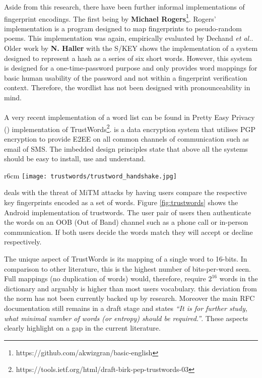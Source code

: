 Aside from this research, there have been further informal implementations of fingerprint encodings. The first being by \textbf{Michael Rogers}\footnote{https://github.com/akwizgran/basic-english}. Rogers' implementation is a program designed to map fingerprints to pseudo-random poems. This implementation was again, empirically evaluated by Dechand \textit{et al.}\cite{dechand2016empirical}. Older work by \textbf{N. Haller} with the S/KEY\cite{haller1995s} shows the implementation of a system designed to represent a hash as a series of six short words. However, this system is designed for a one-time-password purpose and only provides word mappings for basic human usability of the password and not within a fingerprint verification context. Therefore, the wordlist has not been designed with pronounceability in mind.
\\\\
A very recent implementation of a word list can be found in Pretty Easy Privacy (\pep) implementation of TrustWords\footnote{https://tools.ietf.org/html/draft-birk-pep-trustwords-03}. \pep is a data encryption system that utilises PGP encryption to provide E2EE on all common channels of communication such as email of SMS. The imbedded design principles state that above all the systems should be easy to install, use and understand.

\begin{wrapfigure}{r}{6cm}
    \centering
    \texttt{[image: trustwords/trustword\_handshake.jpg]}
    \caption{Trustword fingerprint verification}
    \label{fig:trustwords}
\end{wrapfigure}

\pep deals with the threat of MiTM attacks by having users compare the respective key fingerprints encoded as a set of words. Figure \ref{fig:trustwords} shows the \pep Android implementation of trustwords. The user pair of users then authenticate the words on an OOB (Out of Band) channel such as a phone call or in-person communication. If both users decide the words match they will accept or decline respectively.

The unique aspect of TrustWords is its mapping of a single word to 16-bits. In comparison to other literature, this is the highest number of bits-per-word seen. Full mappings (no duplication of words) would, therefore, require $2^{16}$ words in the dictionary and arguably is higher than most users vocabulary. this deviation from the norm has not been currently backed up by research. Moreover the main RFC documentation still remains in a draft stage and states \textit{``It is for further study, what minimal number of words (or entropy) should be required.''}. These aspects clearly highlight on a gap in the current literature.

